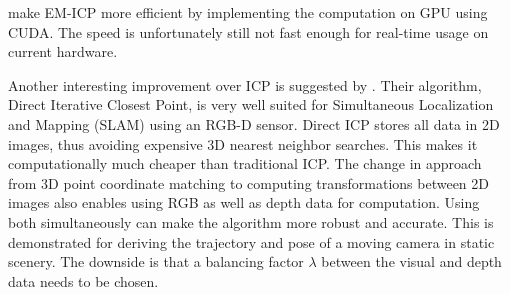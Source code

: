 \citet{tamaki2010softassign} make EM-ICP more efficient by implementing the computation on GPU using CUDA. The speed is unfortunately still not fast enough for real-time usage on current hardware.

Another interesting improvement over ICP is suggested by \citet{tykkala2011direct}. Their algorithm, Direct Iterative Closest Point, is very well suited for Simultaneous Localization and Mapping (SLAM) using an RGB-D sensor. Direct ICP stores all data in 2D images, thus avoiding expensive 3D nearest neighbor searches. This makes it computationally much cheaper than traditional ICP. The change in approach from 3D point coordinate matching to computing transformations between 2D images also enables using RGB as well as depth data for computation. Using both simultaneously can make the algorithm more robust and accurate. This is demonstrated for deriving the trajectory and pose of a moving camera in static scenery. The downside is that a balancing factor $\lambda$ between the visual and depth data needs to be chosen.


